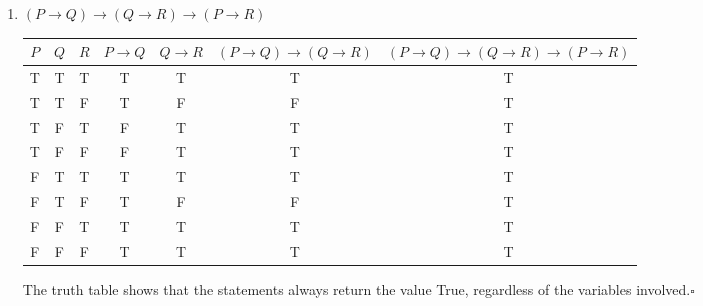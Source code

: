 \documentclass[11pt]{article}
\begin{document}
\begin{enumerate}
	\item $(P \rightarrow Q) \rightarrow(Q \rightarrow R) \rightarrow(P \rightarrow R)$
	      \begin{center}
		      \begin{tabular}{|c|c|c|c|c|c|c|}
			      \hline
			      $P$ & $Q$ & $R$ & $P \rightarrow Q$ & $Q \rightarrow R$ & $(P \rightarrow Q) \rightarrow(Q \rightarrow R)$ & $(P \rightarrow Q) \rightarrow(Q \rightarrow R) \rightarrow(P \rightarrow R)$ \\
			      \hline
			      T   & T   & T   & T                 & T                 & T                                                & T                                                                             \\
			      T   & T   & F   & T                 & F                 & F                                                & T                                                                             \\
			      T   & F   & T   & F                 & T                 & T                                                & T                                                                             \\
			      T   & F   & F   & F                 & T                 & T                                                & T                                                                             \\
			      F   & T   & T   & T                 & T                 & T                                                & T                                                                             \\
			      F   & T   & F   & T                 & F                 & F                                                & T                                                                             \\
			      F   & F   & T   & T                 & T                 & T                                                & T                                                                             \\
			      F   & F   & F   & T                 & T                 & T                                                & T                                                                             \\
			      \hline
		      \end{tabular}
	      \end{center}
	      The truth table shows that the statements always return the value True, regardless of the variables involved.\qquad $\square$


\end{enumerate}
\end{document}
